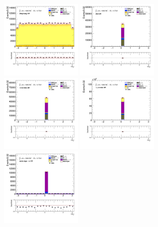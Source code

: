 		\begin{figure}[!htp]
			\begin{center}    
			\includegraphics[width=0.35\textwidth]{chapters/chapter6_HPlus/images/taulep/bjet_0_phi_DILEP_BTAG.png}
			\includegraphics[width=0.35\textwidth]{chapters/chapter6_HPlus/images/taulep/bjet_0_phi_ZEE.png} \\
			\includegraphics[width=0.35\textwidth]{chapters/chapter6_HPlus/images/taulep/bjet_0_phi_TAUEL_BVETO.png} 
			\includegraphics[width=0.35\textwidth]{chapters/chapter6_HPlus/images/taulep/bjet_0_phi_TAUMU_BVETO.png} \\
			\includegraphics[width=0.35\textwidth]{chapters/chapter6_HPlus/images/taulep/bjet_0_phi_SS_TAUEL.png} 

\end{center}
\end{figure}
